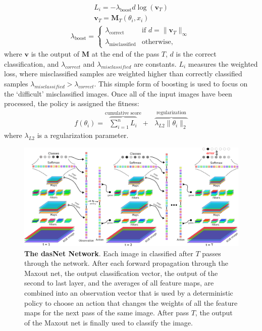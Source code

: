\begin{align}
L_i = -\lambda_{\text{boost}} d \log(\mathbf{v}_T)\\
\mathbf{v}_T = \mathbf{M}_T(\theta_i, x_i)
\end{align}
\begin{align}
\lambda_{\text{boost}} = \begin{cases}
   \lambda_{\text{correct}}     & \text{if } d = \|\mathbf{v}_T\|_{\infty} \\
   \lambda_{\text{misclassified}}       & \text{otherwise,}
  \end{cases} 
\end{align}
\noindent
where $\mathbf{v}$ is the output of $\mathbf{M}$ at the end of the
pass $T$, $d$ is the correct classification, and $\lambda_{correct}$
and $\lambda_{misclassified}$ are constants.  $L_i$ measures the
weighted loss, where misclassified samples are weighted higher than
correctly classified samples $\lambda_{misclassified} >
\lambda_{correct}$.  This simple form of boosting is used to focus on
the `difficult' misclassified images.  Once all of the input images
have been processed, the policy is assigned the fitness:
\begin{align}
f(\theta_i) = \overbrace{\sum_{i=1}^n{L_i}}^{\text{cumulative score}} + \ \
\ \overbrace{\lambda_{L2} \| \theta_i \|_2}^{\text{regularization}}
\end{align}
\noindent
where $\lambda_{L2}$ is a regularization parameter.







\begin{figure}[t]
\centering
\includegraphics[width=\linewidth]{sead_wide.eps}
\caption{{\bf The dasNet Network}. Each image in classified after $T$
  passes through the network.  After each forward propagation through
  the Maxout net, the output classification vector, the output of the
  second to last layer, and the averages of all feature maps, are
  combined into an observation vector that is used by a
  deterministic policy to choose an action that
  changes the weights of all the feature maps for the next pass of the
  same image.  After pass $T$, the output of the Maxout net is finally
used to classify the image.}
\label{fig:model}
\end{figure}




